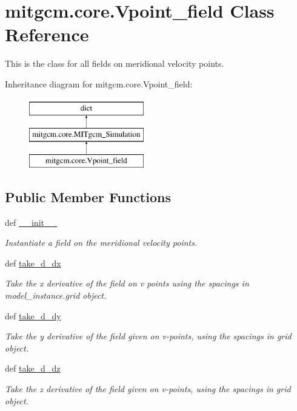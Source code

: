 \hypertarget{classmitgcm_1_1core_1_1Vpoint__field}{\section{mitgcm.\+core.\+Vpoint\+\_\+field Class Reference}
\label{classmitgcm_1_1core_1_1Vpoint__field}
}


This is the class for all fields on meridional velocity points.  


Inheritance diagram for mitgcm.\+core.\+Vpoint\+\_\+field\+:\begin{figure}[H]
\begin{center}
\leavevmode
\includegraphics[height=3.000000cm]{classmitgcm_1_1core_1_1Vpoint__field}
\end{center}
\end{figure}
\subsection*{Public Member Functions}
\begin{DoxyCompactItemize}
\item 
def \hyperlink{classmitgcm_1_1core_1_1Vpoint__field_a1ffd906684a51a4045b0b02092fab5ec}{\+\_\+\+\_\+init\+\_\+\+\_\+}
\begin{DoxyCompactList}\small\item\em Instantiate a field on the meridional velocity points. \end{DoxyCompactList}\item 
def \hyperlink{classmitgcm_1_1core_1_1Vpoint__field_a0077d0cdd01de210b130f1e684d61b6d}{take\+\_\+d\+\_\+dx}
\begin{DoxyCompactList}\small\item\em Take the x derivative of the field on v points using the spacings in model\+\_\+instance.\+grid object. \end{DoxyCompactList}\item 
def \hyperlink{classmitgcm_1_1core_1_1Vpoint__field_a7ffa6c1b239c78422f0224d675fd785e}{take\+\_\+d\+\_\+dy}
\begin{DoxyCompactList}\small\item\em Take the y derivative of the field given on v-\/points, using the spacings in grid object. \end{DoxyCompactList}\item 
def \hyperlink{classmitgcm_1_1core_1_1Vpoint__field_a9975d2dcfb23b8cca0986f7e469882fa}{take\+\_\+d\+\_\+dz}
\begin{DoxyCompactList}\small\item\em Take the z derivative of the field given on v-\/points, using the spacings in grid object. \end{DoxyCompactList}\end{DoxyCompactItemize}
